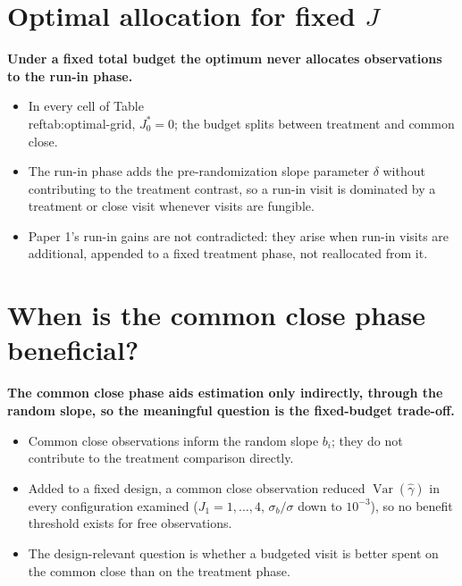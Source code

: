 \documentclass[
  11pt,
]{article}
\begin{document}
\section{\texorpdfstring{Optimal allocation for fixed \(J\)}{Optimal allocation for fixed J}}\label{optimal-allocation-for-fixed-j}

\textbf{Under a fixed total budget the optimum never allocates observations to the run-in phase.}

\begin{itemize}\setlength{\itemsep}{2pt}\setlength{\parskip}{0pt}
\item In every cell of Table \\ref{tab:optimal-grid}, $J_0^* = 0$; the budget splits between treatment and common close.
\item The run-in phase adds the pre-randomization slope parameter $\delta$ without contributing to the treatment contrast, so a run-in visit is dominated by a treatment or close visit whenever visits are fungible.
\item Paper 1's run-in gains are not contradicted: they arise when run-in visits are additional, appended to a fixed treatment phase, not reallocated from it.
\end{itemize}

\section{When is the common close phase beneficial?}\label{when-is-the-common-close-phase-beneficial}

\textbf{The common close phase aids estimation only indirectly, through the random slope, so the meaningful question is the fixed-budget trade-off.}

\begin{itemize}\setlength{\itemsep}{2pt}\setlength{\parskip}{0pt}
\item Common close observations inform the random slope $b_i$; they do not contribute to the treatment comparison directly.
\item Added to a fixed design, a common close observation reduced $\mathop{\mathrm{Var}}(\hat\gamma)$ in every configuration examined ($J_1 = 1, \ldots, 4$, $\sigma_b/\sigma$ down to $10^{-3}$), so no benefit threshold exists for free observations.
\item The design-relevant question is whether a budgeted visit is better spent on the common close than on the treatment phase.
\end{itemize}
\end{document}
